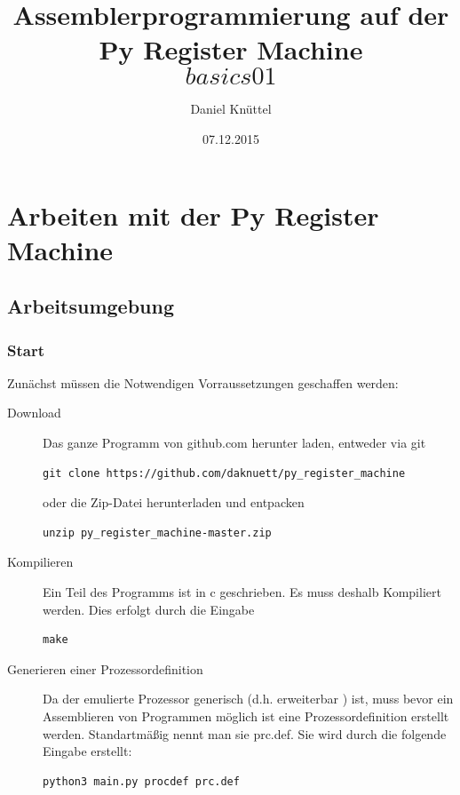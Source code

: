 \documentclass[a4paper,12pt,oneside]{scrreprt}
\title{ Assemblerprogrammierung auf der Py Register Machine \[basics 01\]}
\author{Daniel Knüttel}
\date{07.12.2015}
\begin{document}
\maketitle
\tableofcontents

\part{Arbeiten mit der Py Register Machine}

\chapter{Arbeitsumgebung}

\section{Start}

Zunächst müssen die Notwendigen Vorraussetzungen geschaffen werden:

\begin{description}

\item[Download] Das ganze Programm von github.com herunter laden, entweder via git   

\begin{lstlisting}
git clone https://github.com/daknuett/py_register_machine
\end{lstlisting}

oder die Zip-Datei herunterladen und entpacken

\begin{lstlisting}
unzip py_register_machine-master.zip
\end{lstlisting}

\item[Kompilieren] Ein Teil des Programms ist in c geschrieben. Es muss deshalb Kompiliert werden. Dies erfolgt durch die Eingabe

\begin{lstlisting}
make
\end{lstlisting}


\item[Generieren einer Prozessordefinition] Da der emulierte Prozessor generisch (d.h. erweiterbar )  ist, muss
bevor ein Assemblieren von Programmen möglich ist eine Prozessordefinition erstellt werden. Standartmäßig nennt man sie prc.def.  
Sie wird durch die folgende Eingabe erstellt:

\begin{lstlisting}
python3 main.py procdef prc.def
\end{lstlisting}

\end{description}
\end{document}

